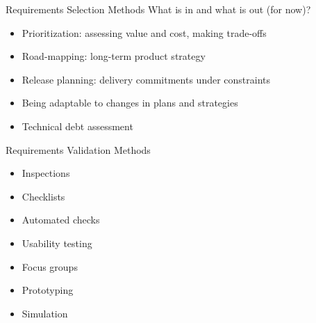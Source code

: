 \documentclass{simpleslides}
\begin{document}
\begin{frame}[fragile]{Requirements Selection Methods}
What is in and what is out (for now)?
\begin{itemize}
\item Prioritization: assessing value and cost, making trade-offs
\item Road-mapping: long-term product strategy 
\item Release planning: delivery commitments under constraints
\item Being adaptable to changes in plans and strategies
\item Technical debt assessment
\end{itemize}
\end{frame}


\begin{frame}[fragile]{Requirements Validation Methods}
\begin{itemize}
\item Inspections
\item Checklists
\item Automated checks
\item Usability testing
\item Focus groups
\item Prototyping
\item Simulation
\end{itemize}
\end{frame}
\end{document}
